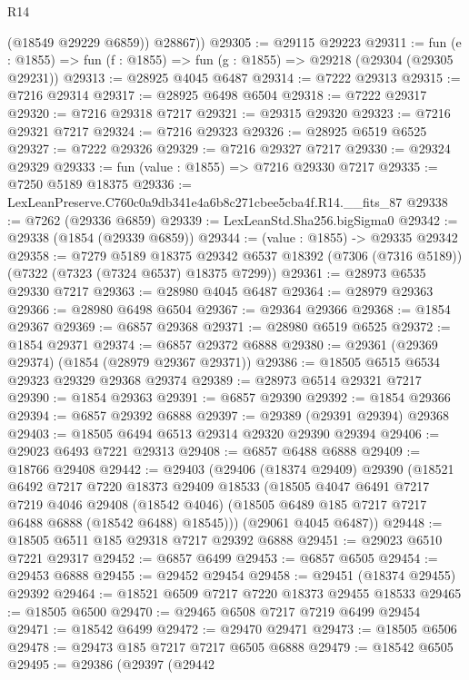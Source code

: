 \begin{lexlean}{R14}
\begin{coremodule}
          (@18549 @29229 @6859))
        @28867))
@29305 := @29115 @29223
@29311 := fun (e : @1855) => fun (f : @1855) => fun (g : @1855) => @29218 (@29304 (@29305 @29231))
@29313 := @28925 @4045 @6487
@29314 := @7222 @29313
@29315 := @7216 @29314
@29317 := @28925 @6498 @6504
@29318 := @7222 @29317
@29320 := @7216 @29318 @7217
@29321 := @29315 @29320
@29323 := @7216 @29321 @7217
@29324 := @7216 @29323
@29326 := @28925 @6519 @6525
@29327 := @7222 @29326
@29329 := @7216 @29327 @7217
@29330 := @29324 @29329
@29333 := fun (value : @1855) => @7216 @29330 @7217
@29335 := @7250 @5189 @18375
@29336 := LexLeanPreserve.C760c0a9db341e4a6b8c271cbee5cba4f.R14.__fits_87
@29338 := @7262 (@29336 @6859)
@29339 := LexLeanStd.Sha256.bigSigma0
@29342 := @29338 (@1854 (@29339 @6859))
@29344 := (value : @1855) -> @29335 @29342
@29358 := @7279
    @5189
    @18375
    @29342
    @6537
    @18392
    (@7306 (@7316 @5189))
    (@7322 (@7323 (@7324 @6537) @18375 @7299))
@29361 := @28973 @6535 @29330 @7217
@29363 := @28980 @4045 @6487
@29364 := @28979 @29363
@29366 := @28980 @6498 @6504
@29367 := @29364 @29366
@29368 := @1854 @29367
@29369 := @6857 @29368
@29371 := @28980 @6519 @6525
@29372 := @1854 @29371
@29374 := @6857 @29372 @6888
@29380 := @29361 (@29369 @29374) (@1854 (@28979 @29367 @29371))
@29386 := @18505 @6515 @6534 @29323 @29329 @29368 @29374
@29389 := @28973 @6514 @29321 @7217
@29390 := @1854 @29363
@29391 := @6857 @29390
@29392 := @1854 @29366
@29394 := @6857 @29392 @6888
@29397 := @29389 (@29391 @29394) @29368
@29403 := @18505 @6494 @6513 @29314 @29320 @29390 @29394
@29406 := @29023 @6493 @7221 @29313
@29408 := @6857 @6488 @6888
@29409 := @18766 @29408
@29442 := @29403
    (@29406
      (@18374 @29409)
      @29390
      (@18521
        @6492
        @7217
        @7220
        @18373
        @29409
        @18533
        (@18505
          @4047
          @6491
          @7217
          @7219
          @4046
          @29408
          (@18542 @4046)
          (@18505 @6489 @185 @7217 @7217 @6488 @6888 (@18542 @6488) @18545)))
      (@29061 @4045 @6487))
@29448 := @18505 @6511 @185 @29318 @7217 @29392 @6888
@29451 := @29023 @6510 @7221 @29317
@29452 := @6857 @6499
@29453 := @6857 @6505
@29454 := @29453 @6888
@29455 := @29452 @29454
@29458 := @29451 (@18374 @29455) @29392
@29464 := @18521 @6509 @7217 @7220 @18373 @29455 @18533
@29465 := @18505 @6500
@29470 := @29465 @6508 @7217 @7219 @6499 @29454
@29471 := @18542 @6499
@29472 := @29470 @29471
@29473 := @18505 @6506
@29478 := @29473 @185 @7217 @7217 @6505 @6888
@29479 := @18542 @6505
@29495 := @29386
    (@29397
      (@29442

\end{coremodule}
\end{lexlean}
